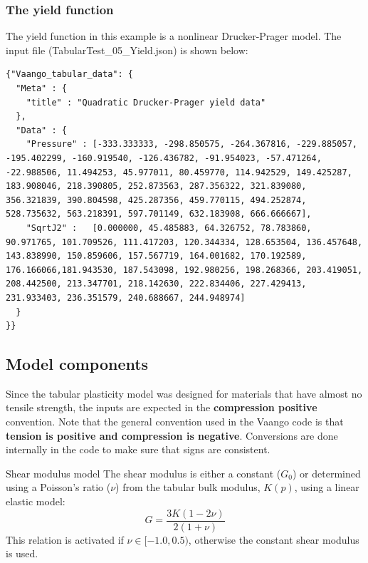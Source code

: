 \subsubsection{The yield function}
The yield function in this example is a nonlinear Drucker-Prager model.  The input file
(\textsf{TabularTest\_05\_Yield.json}) is shown below:
\lstset{
  language=JSON
}
\begin{lstlisting}
{"Vaango_tabular_data": {
  "Meta" : {
    "title" : "Quadratic Drucker-Prager yield data"
  },
  "Data" : {
    "Pressure" : [-333.333333, -298.850575, -264.367816, -229.885057, -195.402299, -160.919540, -126.436782, -91.954023, -57.471264, -22.988506, 11.494253, 45.977011, 80.459770, 114.942529, 149.425287, 183.908046, 218.390805, 252.873563, 287.356322, 321.839080, 356.321839, 390.804598, 425.287356, 459.770115, 494.252874, 528.735632, 563.218391, 597.701149, 632.183908, 666.666667],
    "SqrtJ2" :   [0.000000, 45.485883, 64.326752, 78.783860, 90.971765, 101.709526, 111.417203, 120.344334, 128.653504, 136.457648, 143.838990, 150.859606, 157.567719, 164.001682, 170.192589, 176.166066,181.943530, 187.543098, 192.980256, 198.268366, 203.419051, 208.442500, 213.347701, 218.142630, 222.834406, 227.429413, 231.933403, 236.351579, 240.688667, 244.948974]
  }
}}
\end{lstlisting}

\subsection{Model components}
Since the tabular plasticity model was designed for materials that have almost no tensile strength,
the inputs are expected in the \textbf{compression positive} convention.  Note that the general
convention used in the Vaango code is that \textbf{tension is positive and compression is negative}.
Conversions are done internally in the code to make sure that signs are consistent.

\begin{SummaryBox}[label=box:TableShearModulusModel]{Shear modulus model}
  The shear modulus is either a constant ($G_0$) or determined using a Poisson's ratio ($\nu$)
  from the tabular bulk modulus, $K(p)$, using a linear elastic model:
  \[
    G = \frac{3K(1-2\nu)}{2(1+\nu)}
  \]
  This relation is activated if $\nu \in [-1.0, 0.5)$, otherwise the constant shear modulus
  is used.
\end{SummaryBox}

